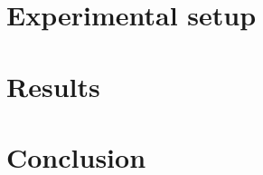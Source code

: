 \documentclass[conference]{IEEEtran}
\begin{document}
\section{Experimental setup}
\section{Results}
\section{Conclusion}
\printbibliography
\end{document}

